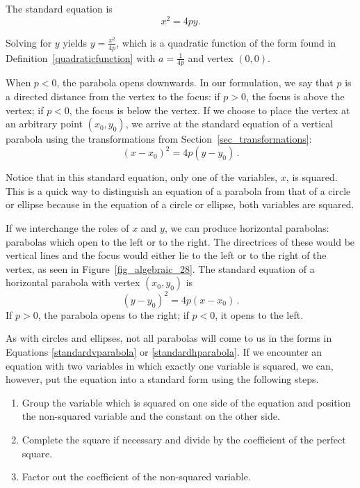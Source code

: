 \ifvc
The standard equation is
\[ x^2  =  4py. \]
\fi

Solving for $y$ yields $y = \frac{x^2}{4p}$, which is a quadratic function of the form found in Definition~\ref{quadraticfunction} with $a = \frac{1}{4p}$ and vertex $(0, 0)$.


When $p < 0$, the parabola opens downwards.  In our formulation, we say that $p$ is a directed distance from the vertex to the focus:  if $p > 0$, the focus is above the vertex;  if $p < 0$, the focus is below the vertex.  If we choose to place the vertex at an arbitrary point $(x_0,y_0)$, we arrive at the standard equation of a vertical parabola  using the transformations from Section~\ref{sec_transformations}: 
\begin{equation}
 (x-x_0)^2 = 4p(y-y_0)\,.
\label{standardvparabola}
\end{equation}

Notice that in this standard equation, only one of the variables, $x$, is squared. This is a quick way to distinguish an equation of a parabola from that of a circle or ellipse because in the equation of a circle or ellipse, both variables are squared.

If we interchange the roles of $x$ and $y$, we can produce horizontal parabolas:  parabolas which open to the left or to the right.  The directrices of these would be vertical lines and the focus would either lie to the left or to the right of the vertex, as seen in Figure~\ref{fig_algebraic_28}. The standard equation of a horizontal parabola with vertex $(x_0,y_0)$  is
\begin{equation}
 (y-y_0)^2 = 4p(x-x_0)\,. 
\label{standardhparabola}
\end{equation}
If $p>0$, the parabola opens to the right;  if $p < 0$, it opens to the left.




As with circles and ellipses, not all parabolas will come to us in the forms in Equations \eqref{standardvparabola} or \eqref{standardhparabola}.  If we encounter an equation with two variables in which exactly one variable is squared, we can, however, put the equation into a standard form using the following steps.

\begin{enumerate}

\item  Group the variable which is squared on one side of the equation and position the non-squared variable and the constant on the other side.

\item  Complete the square if necessary and divide by the coefficient of the perfect square.

\item  Factor out the coefficient of the non-squared variable.

\end{enumerate}

